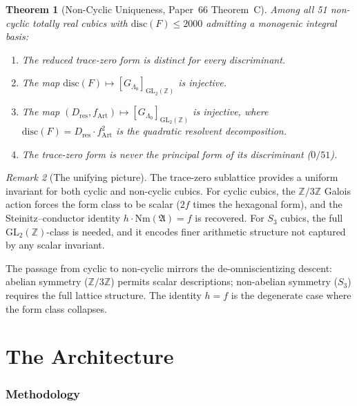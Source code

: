 \documentclass[11pt]{article}
\theoremstyle{plain}
\newtheorem{theorem}{Theorem}[section]
\theoremstyle{definition}
\theoremstyle{remark}
\newtheorem{remark}[theorem]{Remark}
\newcommand{\Z}{\mathbb{Z}}
\newcommand{\fA}{\mathfrak{A}}
\newcommand{\Nm}{\mathrm{Nm}}
\newcommand{\disc}{\mathrm{disc}}
\newcommand{\GL}{\mathrm{GL}}
\begin{document}
\begin{theorem}[Non-Cyclic Uniqueness,
  Paper~66 Theorem~C]\label{thm:noncyclic}
Among all 51 non-cyclic totally real cubics with
$\disc(F) \le 2000$ admitting a monogenic integral basis:
\begin{enumerate}[label=(\roman*)]
\item The reduced trace-zero form is distinct for every
  discriminant.
\item The map $\disc(F) \mapsto [G_{\Lambda_0}]_{\GL_2(\Z)}$
  is injective.
\item The map
  $(D_{\mathrm{res}}, f_{\mathrm{Art}}) \mapsto
  [G_{\Lambda_0}]_{\GL_2(\Z)}$
  is injective, where
  $\disc(F) = D_{\mathrm{res}} \cdot f_{\mathrm{Art}}^2$ is
  the quadratic resolvent decomposition.
\item The trace-zero form is never the principal form of its
  discriminant ($0/51$).
\end{enumerate}
\end{theorem}

\begin{remark}[The unifying picture]
The trace-zero sublattice provides a uniform invariant for both
cyclic and non-cyclic cubics.  For cyclic cubics, the $\Z/3\Z$
Galois action forces the form class to be scalar ($2f$ times the
hexagonal form), and the Steinitz--conductor identity
$h \cdot \Nm(\fA) = f$ is recovered.  For $S_3$ cubics, the
full $\GL_2(\Z)$-class is needed, and it encodes finer
arithmetic structure not captured by any scalar invariant.

The passage from cyclic to non-cyclic mirrors the
de-omniscientizing descent: abelian symmetry ($\Z/3\Z$) permits
scalar descriptions; non-abelian symmetry ($S_3$) requires the
full lattice structure.  The identity $h = f$ is the degenerate
case where the form class collapses.
\end{remark}



\part{The Architecture}\label{part:architecture}

\section{Methodology}\label{sec:method}
\end{document}

